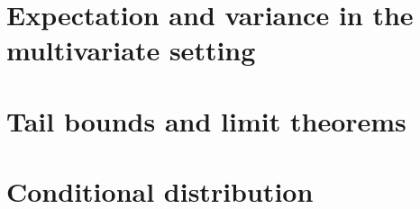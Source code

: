 
\section{Expectation and variance in the multivariate setting}
\label{sec:expect-vari-mult}


\section{Tail bounds and limit theorems}
\label{sec:tail-bounds-limit}


\section{Conditional distribution}
\label{sec:cond-distr}





